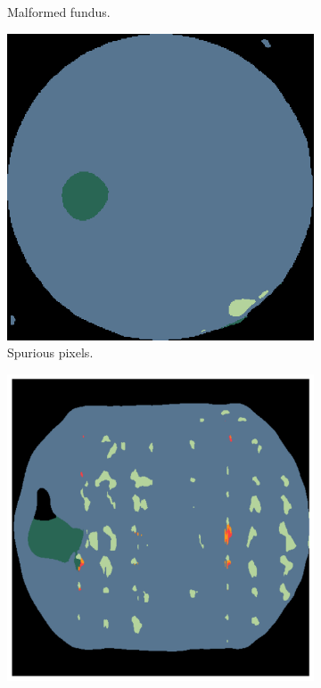 \begin{figure}[h]
\begin{subfigure}[t]{0.19\textwidth}
        \caption{Malformed fundus.}
        \label{fig:malformed_fundus}
    \end{subfigure} %
    \hfill
    \begin{subfigure}[t]{0.19\textwidth}
        \centering
        \includegraphics[width=\linewidth]{labels/figs/spurious-pixels.png}
        \caption{Spurious pixels.}
        \label{fig:spurious_pixels}
    \end{subfigure} %
    \hfill
    \begin{subfigure}[t]{0.19\textwidth}
        \centering
        \includegraphics[width=\linewidth]{labels/figs/hole.png}

\end{subfigure}
\end{figure}
